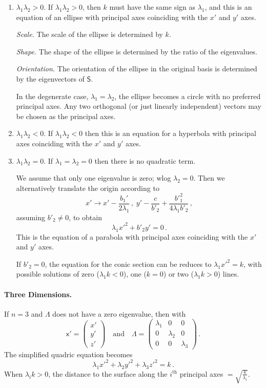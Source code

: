 \documentclass{article}
\theoremstyle{plain}\theoremheaderfont{\normalfont\itshape}\theorembodyfont{\rmfamily}\theoremseparator{.}\newtheorem*{rem}{Remark}\newtheorem*{ex}{Example}\newtheorem*{proof}{Proof}\newtheorem*{altp}{Alternative proof}
\theoremstyle{plain}\theoremheaderfont{\normalfont\bfseries}\theorembodyfont{\rmfamily}\theoremseparator{.}\newtheorem{thm}{Theorem}[section]\newtheorem{lem}[thm]{Lemma}\newtheorem{prop}[thm]{Proposition}\newtheorem*{cor}{Corollary}\newtheorem{defn}[thm]{Definition}\newtheorem{clm}[thm]{Claim}\newtheorem{clminproof}{Claim}
\theoremstyle{break}\theoremheaderfont{\normalfont\itshape}\theorembodyfont{\rmfamily}\theoremseparator{.\medskip}\newtheorem*{proofskip}{Proof}\newtheorem*{exs}{Examples}\newtheorem*{rems}{Remarks}
\theoremstyle{break}\theoremheaderfont{\normalfont\bfseries}\theorembodyfont{\rmfamily}\theoremseparator{.\medskip}\newtheorem{lemskip}[thm]{Lemma}\newtheorem{defnskip}[thm]{Definition}\newtheorem{propskip}[thm]{Proposition}\newtheorem{thmskip}[thm]{Theorem}
\numberwithin{equation}{section}
\begin{document}
	\begin{enumerate}[topsep=0pt,parsep=1em]
		\item \(\lambda_1\lambda_2>0\). If \(\lambda_1\lambda_2>0\), then \(k\) must have the same sign as \(\lambda_1\), and this is an equation of an ellipse with principal axes coinciding with the \(x'\) and \(y'\) axes.
		
		\textit{Scale.} The scale of the ellipse is determined by \(k\).
		
		\textit{Shape.} The shape of the ellipse is determined by the ratio of the eigenvalues.
		
		\textit{Orientation.} The orientation of the ellipse in the original basis is determined by the eigenvectors of \(\mathsf{S}\).
		
		In the degenerate case, \(\lambda_1=\lambda_2\), the ellipse becomes a circle with no preferred principal axes. Any two orthogonal (or just linearly independent) vectors may be chosen as the principal axes. 
		\item \(\lambda_1\lambda_2<0\). If \(\lambda_1\lambda_2<0\) then this is an equation for a hyperbola with principal axes coinciding with the \(x'\) and \(y'\) axes.
		\item \(\lambda_1\lambda_2=0\). If \(\lambda_1=\lambda_2=0\) then there is no quadratic term.
		
		We assume that only one eigenvalue is zero; wlog \(\lambda_2=0\). Then we alternatively translate the origin according to
		\[x'\to x'-\frac{b_1'}{2\lambda_1}\,,\;y'-\frac{c}{b'_2}+\frac{{b'}_1^2}{4\lambda_1 b'_2}\,,\]
		assuming \(b'_2\ne 0\), to obtain
		\[\lambda_1 x'^2+b'_2y'=0\,.\]
		This is the equation of a parabola with principal axes coinciding with the \(x'\) and \(y'\) axes.
		
		If \(b'_2=0\), the equation for the conic section can be reduces to \(\lambda_1 x'^2=k\), with possible solutions of zero (\(\lambda_1 k<0\)), one (\(k=0\)) or two (\(\lambda_1k>0\)) lines. 
	\end{enumerate}
	
	\paragraph{Three Dimensions.} If \(n=3\) and \(\mathsf{\Lambda}\) does not have a zero eigenvalue, then with
	\[\mathsf{x}'=\begin{pmatrix}
		x' \\ y' \\ z'
	\end{pmatrix}\quad\text{and}\quad\mathsf{\Lambda}=\begin{pmatrix}
		\lambda_1 & 0 & 0\\
		0 & \lambda_2 & 0\\
		0 & 0 & \lambda_3
	\end{pmatrix}\,.\]
	The simplified quadric equation becomes
	\[\lambda_1 x'^2+\lambda_2 y'^2+\lambda_3 z'^2=k\,.\]
	When \(\lambda_i k>0\), the distance to the surface along the \(i^\text{th}\) principal axes \(=\sqrt{\frac{k}{\lambda_i}}\).
	
\end{document}
